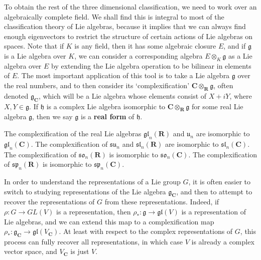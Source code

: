 To obtain the rest of the three dimensional classification, we need to work over an algebraically complete field. We shall find this is integral to most of the classification theory of Lie algebras, because it implies that we can always find enough eigenvectors to restrict the structure of certain actions of Lie algebras on spaces. Note that if $K$ is any field, then it has some algebraic closure $E$, and if $\mathfrak{g}$ is a Lie algebra over $K$, we can consider a corresponding algebra $E \otimes_K \mathfrak{g}$ as a Lie algebra over $E$ by extending the Lie algebra operation to be bilinear in elements of $E$. The most important application of this tool is to take a Lie algebra $\mathfrak{g}$ over the real numbers, and to then consider its `complexification' $\mathbf{C} \otimes_{\mathbf{R}} \mathfrak{g}$, often denoted $\mathfrak{g}_{\mathbf{C}}$, which will be a Lie algebra whose elements consist of $X + iY$, where $X,Y \in \mathfrak{g}$. If $\mathfrak{h}$ is a complex Lie algebra isomorphic to $\mathbf{C} \otimes_{\mathbf{R}} \mathfrak{g}$ for some real Lie algebra $\mathfrak{g}$, then we say $\mathfrak{g}$ is a {\bf real form} of $\mathfrak{h}$.

\begin{example}
    The complexification of the real Lie algebras $\mathfrak{gl}_n(\mathbf{R})$ and $\mathfrak{u}_n$ are isomorphic to $\mathfrak{gl}_n(\mathbf{C})$. The complexification of $\mathfrak{su}_n$ and $\mathfrak{sl}_n(\mathbf{R})$ are isomorphic to $\mathfrak{sl}_n(\mathbf{C})$. The complexification of $\mathfrak{so}_n(\mathbf{R})$ is isomorphic to $\mathfrak{so}_n(\mathbf{C})$. The complexification of $\mathfrak{sp}_n(\mathbf{R})$ is isomorphic to $\mathfrak{sp}_n(\mathbf{C})$.
\end{example}

In order to understand the representations of a Lie group $G$, it is often easier to switch to studying representations of the Lie algebra $\mathfrak{g}_\mathbf{C}$, and then to attempt to recover the representations of $G$ from these representations. Indeed, if $\rho: G \to GL(V)$ is a representation, then $\rho_*: \mathfrak{g} \to \mathfrak{gl}(V)$ is a representation of Lie algebras, and we can extend this map to a complexification map $\rho_*: \mathfrak{g}_\mathbf{C} \to \mathfrak{gl}(V_\mathbf{C})$. At least with respect to the complex representations of $G$, this process can fully recover all representations, in which case $V$ is already a complex vector space, and $V_{\mathbf{C}}$ is just $V$.


